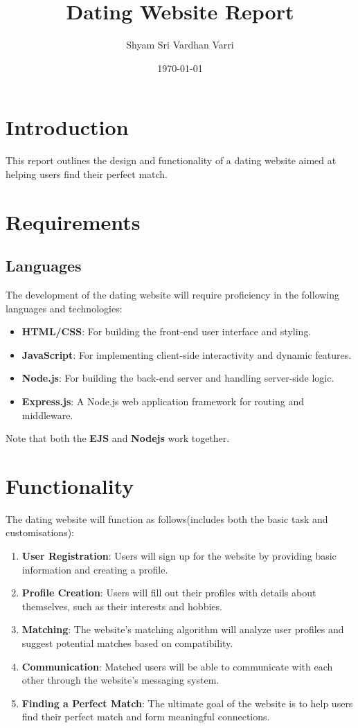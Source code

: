 \documentclass{article}
\title{Dating Website Report}
\author{Shyam Sri Vardhan Varri}
\date{\today}
\begin{document}
\maketitle

\section{Introduction}
 This report outlines the design and functionality of a dating website aimed at helping users find their perfect match.

\section{Requirements}

\subsection{Languages}
The development of the dating website will require proficiency in the following languages and technologies:

\begin{itemize}
    \item \textbf{HTML/CSS}: For building the front-end user interface and styling.
    \item \textbf{JavaScript}: For implementing client-side interactivity and dynamic features.
    \item \textbf{Node.js}: For building the back-end server and handling server-side logic.
    \item \textbf{Express.js}: A Node.js web application framework for routing and middleware.
\end{itemize}   
Note that both the \textbf{EJS} and \textbf{Nodejs} work together.


\section{Functionality}
The dating website will function as follows(includes both the basic task and customisations):

\begin{enumerate}
    \item \textbf{User Registration}: Users will sign up for the website by providing basic information and creating a profile.
    \item \textbf{Profile Creation}: Users will fill out their profiles with details about themselves, such as their interests and hobbies.
    \item \textbf{Matching}: The website's matching algorithm will analyze user profiles and suggest potential matches based on compatibility.
    \item \textbf{Communication}: Matched users will be able to communicate with each other through the website's messaging system.
    \item \textbf{Finding a Perfect Match}: The ultimate goal of the website is to help users find their perfect match and form meaningful connections.
\end{enumerate}
\end{document}
